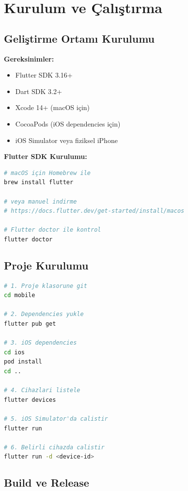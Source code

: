 \documentclass[12pt,a4paper]{article}
\begin{document}
\newpage

\section{Kurulum ve Çalıştırma}

\subsection{Geliştirme Ortamı Kurulumu}

\textbf{Gereksinimler:}
\begin{itemize}
    \item Flutter SDK 3.16+
    \item Dart SDK 3.2+
    \item Xcode 14+ (macOS için)
    \item CocoaPods (iOS dependencies için)
    \item iOS Simulator veya fiziksel iPhone
\end{itemize}

\textbf{Flutter SDK Kurulumu:}

\begin{lstlisting}[language=bash]
# macOS için Homebrew ile
brew install flutter

# veya manuel indirme
# https://docs.flutter.dev/get-started/install/macos

# Flutter doctor ile kontrol
flutter doctor
\end{lstlisting}

\subsection{Proje Kurulumu}

\begin{lstlisting}[language=bash]
# 1. Proje klasorune git
cd mobile

# 2. Dependencies yukle
flutter pub get

# 3. iOS dependencies
cd ios
pod install
cd ..

# 4. Cihazlari listele
flutter devices

# 5. iOS Simulator'da calistir
flutter run

# 6. Belirli cihazda calistir
flutter run -d <device-id>
\end{lstlisting}

\subsection{Build ve Release}
\end{document}
